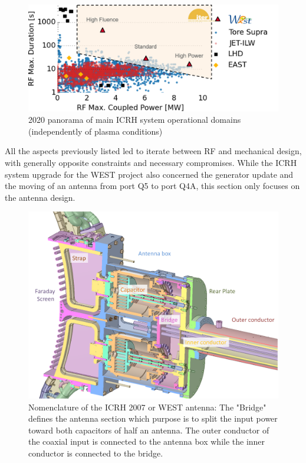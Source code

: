 \begin{figure}[h]
	\centering
	\includegraphics[width=1.0\linewidth]{figures/chap3/WEST_ICRH/WEST_ICRH_comparaison_other_machines}
	\caption{2020 panorama of main ICRH system operational domains (independently of plasma conditions)}
	\label{fig:westicrhcomparaisonothermachines}
\end{figure}

All the aspects previously listed led to iterate between RF and mechanical design, with generally opposite constraints and necessary compromises. While the ICRH system upgrade for the WEST project also concerned the generator update and the moving of an antenna from port Q5 to port Q4A, this section only focuses on the antenna design. 


\begin{figure}
	\centering
	\includegraphics[width=0.7\linewidth]{figures/chap3/WEST_ICRH/proto2007_antenna_cut}
	\caption{Nomenclature of the ICRH 2007 or WEST antenna: The "Bridge" defines the antenna section which purpose is to split the input power toward both capacitors of half an antenna. The outer conductor of the coaxial input is connected to the antenna box while the inner conductor is connected to the bridge.}
	\label{fig:proto2007antennacut}
\end{figure}


